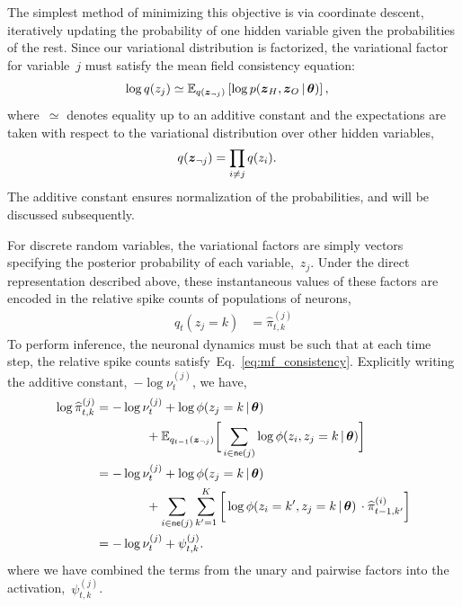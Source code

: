 The simplest method of minimizing this objective is via coordinate
descent, iteratively updating the probability of one hidden variable
given the probabilities of the rest. Since our variational
distribution is factorized, the variational factor for variable~$j$
must satisfy the mean field consistency equation:
\begin{align}
  \label{eq:mf_consistency}
  \log q(z_j) &\simeq \mathbb{E}_{q(\boldsymbol{z}_{\neg j})}
  \left[ \log p(\boldsymbol{z}_H, \boldsymbol{z}_O \,|\, \boldsymbol{\theta}) \right],
\end{align}
where~$\simeq$ denotes equality up to an additive constant and the
expectations are taken with respect to the variational
distribution over other hidden variables,
\begin{align}
  q(\boldsymbol{z}_{\neg j}) &= \prod_{i \neq j} q(z_{i}).
\end{align}
The additive constant
ensures normalization of the probabilities, and will be discussed
subsequently.  

For discrete random variables, the variational factors are simply
vectors specifying the posterior probability of each variable,~$z_j$.
Under the direct representation described above, these instantaneous
values of these factors are encoded in the relative spike counts of
populations of neurons,
\begin{align}
  q_t(z_j=k) &= \widehat{\pi}_{t,k}^{(j)} 
\end{align}
To perform inference, the neuronal dynamics must be such that at each
time step, the relative spike counts satisfy~Eq.~\ref{eq:mf_consistency}. 
Explicitly writing the additive constant,~$-\log \nu_t^{(j)}$, we have,
\begin{align}
  \nonumber
  \log \widehat{\pi}_{t,k}^{(j)} 
  &= -\log \nu_t^{(j)} + \log \phi(z_j=k \,|\, \boldsymbol{\theta}) \\
  &\hspace{4em} + \mathbb{E}_{q_{t-1}(\boldsymbol{z}_{\neg j})} \bigg[
  \sum_{i \in \mathsf{ne}(j)} \log \phi(z_{i}, z_j=k \,|\, \boldsymbol{\theta}) \bigg] \\
  & \nonumber = 
     - \log \nu_t^{(j)} + \log \phi(z_j=k \,|\, \boldsymbol{\theta}) \\
  & \label{eq:variational_rate}
  \hspace{4em} + \sum_{i \in \mathsf{ne}(j)} \sum_{k'=1}^K
  \bigg[\log \phi(z_{i}=k', z_j=k \,|\, \boldsymbol{\theta}) \,\cdot  \widehat{\pi}_{t-1,k'}^{(i)} \bigg] \\
  &= -\log \nu_t^{(j)} + \psi_{t,k}^{(j)}.
\end{align}
where we have combined the terms from the unary and pairwise factors
into the activation,~$\psi_{t,k}^{(j)}$.

